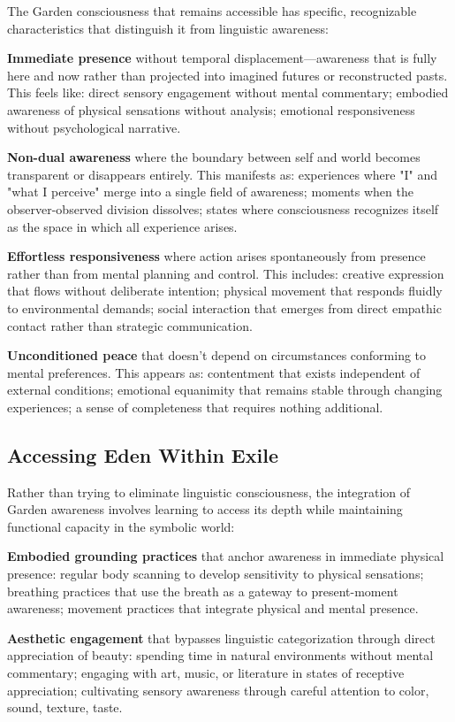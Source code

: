 The Garden consciousness that remains accessible has specific, recognizable characteristics that distinguish it from linguistic awareness:

\textbf{Immediate presence} without temporal displacement—awareness that is fully here and now rather than projected into imagined futures or reconstructed pasts. This feels like: direct sensory engagement without mental commentary; embodied awareness of physical sensations without analysis; emotional responsiveness without psychological narrative.

\textbf{Non-dual awareness} where the boundary between self and world becomes transparent or disappears entirely. This manifests as: experiences where "I" and "what I perceive" merge into a single field of awareness; moments when the observer-observed division dissolves; states where consciousness recognizes itself as the space in which all experience arises.

\textbf{Effortless responsiveness} where action arises spontaneously from presence rather than from mental planning and control. This includes: creative expression that flows without deliberate intention; physical movement that responds fluidly to environmental demands; social interaction that emerges from direct empathic contact rather than strategic communication.

\textbf{Unconditioned peace} that doesn't depend on circumstances conforming to mental preferences. This appears as: contentment that exists independent of external conditions; emotional equanimity that remains stable through changing experiences; a sense of completeness that requires nothing additional.

\subsection{Accessing Eden Within Exile}

Rather than trying to eliminate linguistic consciousness, the integration of Garden awareness involves learning to access its depth while maintaining functional capacity in the symbolic world:

\textbf{Embodied grounding practices} that anchor awareness in immediate physical presence: regular body scanning to develop sensitivity to physical sensations; breathing practices that use the breath as a gateway to present-moment awareness; movement practices that integrate physical and mental presence.

\textbf{Aesthetic engagement} that bypasses linguistic categorization through direct appreciation of beauty: spending time in natural environments without mental commentary; engaging with art, music, or literature in states of receptive appreciation; cultivating sensory awareness through careful attention to color, sound, texture, taste.

